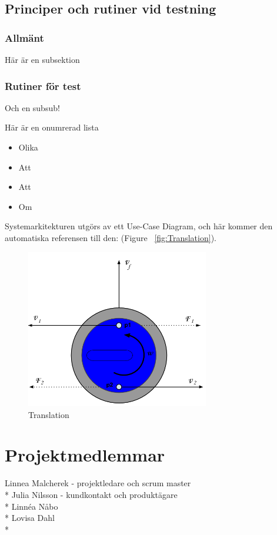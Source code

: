 \documentclass[11pt]{article} %
\begin{document}
\subsection{Principer och rutiner vid testning}

\subsubsection{Allmänt}
Här är en subsektion

\subsubsection{Rutiner för test}
Och en subsub!

Här är en onumrerad lista
\begin{itemize}
\item Olika
\item Att 
\item Att
\item Om 
\end{itemize}



Systemarkitekturen utgörs av ett Use-Case Diagram, och här kommer den automatiska referensen till den:   (Figure ~\ref{fig:Translation}).

\begin{figure}[ht!]
\centering
\includegraphics[width=80mm]{Translation.png}
\caption{Translation}
\label{fig:Translation}
\label{overflow}
\end{figure}


\pagebreak


\section{Projektmedlemmar}

Linnea Malcherek - projektledare och scrum master\\*
Julia Nilsson - kundkontakt och produktägare\\*
Linnéa Nåbo \\*
Lovisa Dahl\\*
\end{document}
